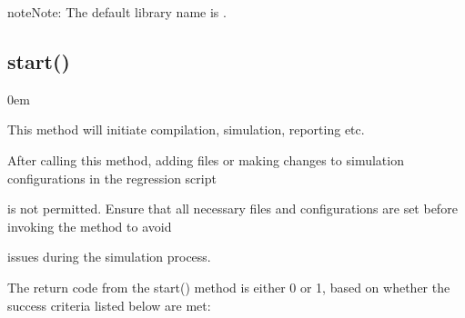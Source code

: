 \documentclass[letterpaper,10pt,english]{sphinxmanual}
\begin{document}
\sphinxAtStartPar
{}

\begin{sphinxVerbatim}[commandchars=\\\{\}]
\end{sphinxVerbatim}

\begin{sphinxadmonition}{note}{Note:}
\sphinxAtStartPar
The default library name is .
\end{sphinxadmonition}


\subsection{start()}
\label{\detokenize{api:start}}
\begin{DUlineblock}{0em}
\item[] This method will initiate compilation, simulation, reporting etc.
\item[] After calling this method, adding files or making changes to simulation configurations in the regression script
\item[] is not permitted. Ensure that all necessary files and configurations are set before invoking the method to avoid
\item[] issues during the simulation process.
\end{DUlineblock}

\sphinxAtStartPar
{}

\sphinxAtStartPar
The return code from the start() method is either 0 or 1, based on whether the success criteria listed below are met:
\end{document}
